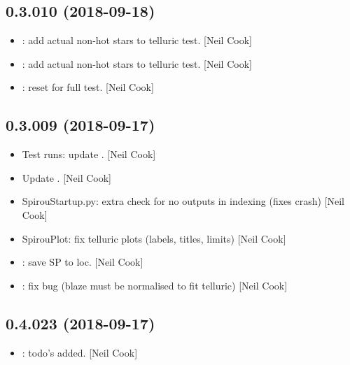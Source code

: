 \documentclass[a4paper,10pt,english]{report}
\begin{document}
\subsection{0.3.010 (2018-09-18)}
\label{\detokenize{misc/changelog:id322}}\begin{itemize}
\item {} 
: add actual non-hot stars to telluric test. {[}Neil Cook{]}

\item {} 
: add actual non-hot stars to telluric test. {[}Neil Cook{]}

\item {} 
: reset for full test. {[}Neil Cook{]}

\end{itemize}


\subsection{0.3.009 (2018-09-17)}
\label{\detokenize{misc/changelog:id323}}\begin{itemize}
\item {} 
Test runs: update . {[}Neil Cook{]}

\item {} 
Update . {[}Neil Cook{]}

\item {} 
SpirouStartup.py: extra check for no outputs in indexing (fixes crash)
{[}Neil Cook{]}

\item {} 
SpirouPlot: fix telluric plots (labels, titles, limits) {[}Neil Cook{]}

\item {} 
: save SP to loc. {[}Neil Cook{]}

\item {} 
: fix bug (blaze must be normalised to fit telluric)
{[}Neil Cook{]}

\end{itemize}


\subsection{0.4.023 (2018-09-17)}
\label{\detokenize{misc/changelog:id324}}\begin{itemize}
\item {} 
: todo’s added. {[}Neil Cook{]}

\end{itemize}
\end{document}
